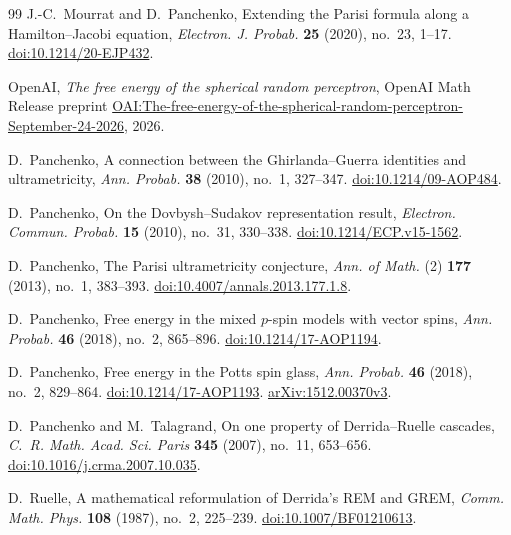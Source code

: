 \documentclass[11pt]{article}
\numberwithin{equation}{section}
\theoremstyle{definition}
\begin{document}
\begin{thebibliography}{99}
J.-C.~Mourrat and D.~Panchenko, Extending the Parisi formula along a Hamilton--Jacobi equation,
\emph{Electron. J. Probab.} \textbf{25} (2020), no.~23, 1--17.
\href{https://doi.org/10.1214/20-EJP432}{doi:10.1214/20-EJP432}.

OpenAI, \emph{The free energy of the spherical random perceptron},
OpenAI Math Release preprint
\href{https://github.com/openai/math/blob/main/preprints/The-free-energy-of-the-spherical-random-perceptron-September-24-2026/The-free-energy-of-the-spherical-random-perceptron-September-24-2026.pdf}{OAI:The-free-energy-of-the-spherical-random-perceptron-September-24-2026},
2026.

D.~Panchenko, A connection between the Ghirlanda--Guerra identities and ultrametricity,
\emph{Ann. Probab.} \textbf{38} (2010), no.~1, 327--347.
\href{https://doi.org/10.1214/09-AOP484}{doi:10.1214/09-AOP484}.

D.~Panchenko, On the Dovbysh--Sudakov representation result,
\emph{Electron. Commun. Probab.} \textbf{15} (2010), no.~31, 330--338.
\href{https://doi.org/10.1214/ECP.v15-1562}{doi:10.1214/ECP.v15-1562}.

D.~Panchenko, The Parisi ultrametricity conjecture,
\emph{Ann. of Math.} (2) \textbf{177} (2013), no.~1, 383--393.
\href{https://doi.org/10.4007/annals.2013.177.1.8}{doi:10.4007/annals.2013.177.1.8}.

D.~Panchenko, Free energy in the mixed $p$-spin models with vector spins,
\emph{Ann. Probab.} \textbf{46} (2018), no.~2, 865--896.
\href{https://doi.org/10.1214/17-AOP1194}{doi:10.1214/17-AOP1194}.

D.~Panchenko, Free energy in the Potts spin glass,
\emph{Ann. Probab.} \textbf{46} (2018), no.~2, 829--864.
\href{https://doi.org/10.1214/17-AOP1193}{doi:10.1214/17-AOP1193}.
\href{https://arxiv.org/abs/1512.00370v3}{arXiv:1512.00370v3}.

D.~Panchenko and M.~Talagrand,
On one property of Derrida--Ruelle cascades,
\emph{C.~R. Math. Acad. Sci. Paris} \textbf{345} (2007), no.~11, 653--656.
\href{https://doi.org/10.1016/j.crma.2007.10.035}{doi:10.1016/j.crma.2007.10.035}.

D.~Ruelle, A mathematical reformulation of Derrida's REM and GREM,
\emph{Comm. Math. Phys.} \textbf{108} (1987), no.~2, 225--239.
\href{https://doi.org/10.1007/BF01210613}{doi:10.1007/BF01210613}.


\end{thebibliography}
\end{document}

